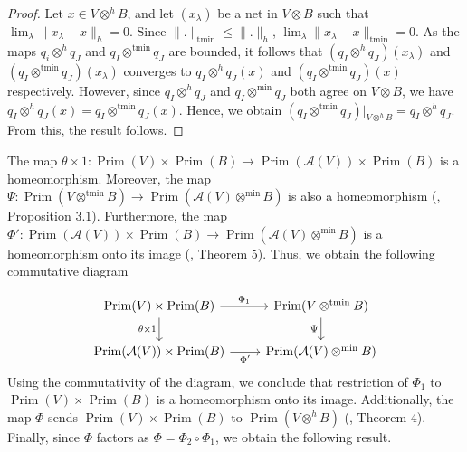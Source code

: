 \documentclass{birkjour}
\theoremstyle{definition}
\theoremstyle{remark}
\numberwithin{equation}{section}
\begin{document}
\begin{proof}

Let $x \in V \otimes^h B$, and let $(x_\lambda)$ be a net in $V \otimes B$ such that $\lim_\lambda \| x_\lambda - x \|_h = 0$. Since $\|.\|_{\text{tmin}} \leq \|.\|_h$, 
$\lim_\lambda \| x_\lambda - x \|_{\text{tmin}} = 0$. As the maps $q_i \otimes^h q_J$ and $q_I \otimes^{\text{tmin}} q_J$ are bounded, it follows that $(q_I \otimes^h q_J)(x_\lambda)$ and $(q_I \otimes^{\text{tmin}} q_J)(x_\lambda)$ converges to $q_I \otimes^h q_J(x)$ and $(q_I \otimes^{\text{tmin}} q_J)(x)$ respectively. However, since $q_I \otimes^h q_J$ and $q_I \otimes^{\text{min}} q_J$ both agree on $V \otimes B$, we have $q_I \otimes^h q_J(x)= q_I \otimes^{\text{tmin}} q_J(x)$. Hence, we obtain $(q_I \otimes^{\text{tmin}} q_J) \vert_{V \otimes^h B}= q_I \otimes^h q_J$. From this, the result follows.


    
\end{proof}


The map $\theta \times 1:\operatorname{Prim}(V) \times \operatorname{Prim}(B) \to \operatorname{Prim}(\mathcal{A}(V)) \times \operatorname{Prim}(B) $ is a homeomorphism. Moreover, the map $\Psi: \operatorname{Prim}(V \otimes^{\text{tmin}} B) \to \operatorname{Prim}(\mathcal{A}(V) \otimes^{\text{min}} B)$ is also a homeomorphism (\cite{MK_JR}, Proposition $3.1$). Furthermore, the map $\Phi': \operatorname{Prim}(\mathcal{A}(V)) \times \operatorname{Prim}(B) \to \operatorname{Prim}(\mathcal{A}(V) \otimes^{\text{min}} B)  $ is a homeomorphism onto its image (\cite{Gui}, Theorem $5$). Thus, we obtain the following commutative diagram


\[
\begin{tikzcd}
  \operatorname{Prim}(V) \times \operatorname{Prim}(B)
    \arrow[r, "\Phi_1"]
    \arrow[d, swap, "\theta \times 1"]
  &
  \operatorname{Prim}(V \otimes^{\text{tmin}} B)
    \arrow[d, swap, "\Psi"]
  \\
  \operatorname{Prim}(\mathcal{A}(V)) \times \operatorname{Prim}(B)
    \arrow[r, swap, "\Phi'"]
  &
  \operatorname{Prim}(\mathcal{A}(V)\otimes^{\mathrm{min}} B)
\end{tikzcd}
\]
 Using the commutativity of the diagram, we conclude that restriction of $\Phi_1$ to \newline $\operatorname{Prim}(V) \times \operatorname{Prim}(B)$  is a homeomorphism onto its image. Additionally,   the map \(\Phi\) sends \(\operatorname{Prim}(V) \times \operatorname{Prim}(B)\) to \(\operatorname{Prim}(V \otimes^h B)\) (\cite{AA}, Theorem $4$). Finally, since \(\Phi\) factors as \(\Phi = \Phi_2 \circ \Phi_1\), we obtain the following result. 
\end{document}
